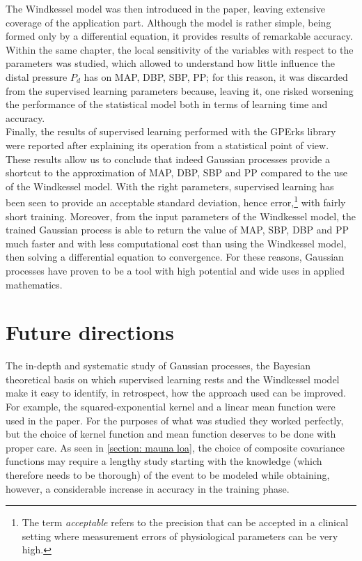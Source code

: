 The Windkessel model was then introduced in the paper, leaving extensive coverage of the application part. Although the model is rather simple, being formed only by a differential equation, it provides results of remarkable accuracy. Within the same chapter, the local sensitivity of the variables with respect to the parameters was studied, which allowed to understand how little influence the distal pressure $P_d$ has on MAP, DBP, SBP, PP; for this reason, it was discarded from the supervised learning parameters because, leaving it, one risked worsening the performance of the statistical model both in terms of learning time and accuracy.\\

Finally, the results of supervised learning performed with the GPErks library were reported after explaining its operation from a statistical point of view. These results allow us to conclude that indeed Gaussian processes provide a shortcut to the approximation of MAP, DBP, SBP and PP compared to the use of the Windkessel model. With the right parameters, supervised learning has been seen to provide an acceptable standard deviation, hence error,\footnote{The term \textit{acceptable} refers to the precision that can be accepted in a clinical setting where measurement errors of physiological parameters can be very high.} with fairly short training. Moreover, from the input parameters of the Windkessel model, the trained Gaussian process is able to return the value of MAP, SBP, DBP and PP much faster and with less computational cost than using the Windkessel model, then solving a differential equation to convergence. For these reasons, Gaussian processes have proven to be a tool with high potential and wide uses in applied mathematics.



\section{Future directions}
The in-depth and systematic study of Gaussian processes, the Bayesian theoretical basis on which supervised learning rests and the Windkessel model make it easy to identify, in retrospect, how the approach used can be improved.\\

For example, the squared-exponential kernel and a linear mean function were used in the paper. For the purposes of what was studied they worked perfectly, but the choice of kernel function and mean function deserves to be done with proper care. As seen in \ref{section: mauna loa}, the choice of composite covariance functions may require a lengthy study starting with the knowledge (which therefore needs to be thorough) of the event to be modeled while obtaining, however, a considerable increase in accuracy in the training phase.

